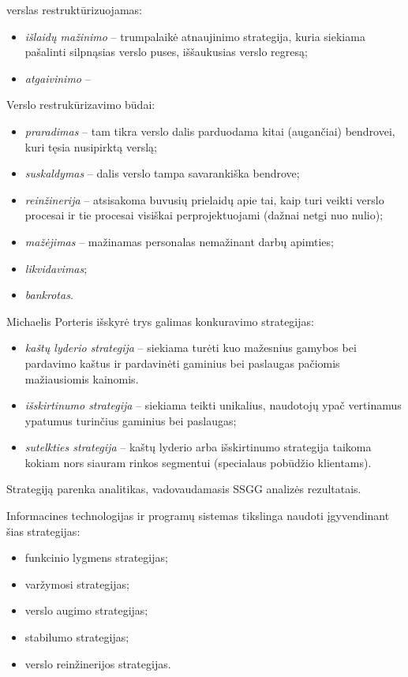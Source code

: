 \begin{itemize}
    verslas restruktūrizuojamas:
    \begin{itemize}
      \item \emph{išlaidų mažinimo}  – trumpalaikė 
        atnaujinimo strategija, kuria siekiama pašalinti silpnąsias verslo
        puses, iššaukusias verslo regresą;
      \item \emph{atgaivinimo}  – 
    \end{itemize}
    Verslo restrukūrizavimo būdai:
    \begin{itemize}
      \item \emph{praradimas}  – tam tikra verslo dalis
        parduodama kitai (augančiai) bendrovei, kuri tęsia nusipirktą
        verslą;
      \item \emph{suskaldymas}  – dalis verslo tampa
        savarankiška bendrove;
      \item \emph{reinžinerija} – atsisakoma buvusių prielaidų apie tai,
        kaip turi veikti verslo procesai ir tie procesai visiškai
        perprojektuojami (dažnai netgi nuo nulio);
      \item \emph{mažėjimas}  – mažinamas 
        personalas nemažinant darbų apimties;
      \item \emph{likvidavimas};
      \item \emph{bankrotas}.
    \end{itemize}
\end{itemize}

Michaelis Porteris  išskyrė trys galimas konkuravimo
strategijas:
\begin{itemize}
  \item \emph{kaštų lyderio strategija} – siekiama turėti kuo mažesnius
    gamybos bei pardavimo kaštus ir pardavinėti gaminius bei paslaugas
    pačiomis mažiausiomis kainomis.
  \item \emph{išskirtinumo strategija} – siekiama teikti unikalius,
    naudotojų ypač vertinamus ypatumus turinčius gaminius bei paslaugas;
  \item \emph{sutelkties strategija} – kaštų lyderio arba išskirtinumo
    strategija taikoma kokiam nors siauram rinkos segmentui (specialaus
    pobūdžio klientams).
\end{itemize}
Strategiją parenka analitikas, vadovaudamasis SSGG analizės rezultatais.

Informacines technologijas ir programų sistemas tikslinga naudoti
įgyvendinant šias strategijas:
\begin{itemize}
  \item funkcinio lygmens strategijas;
  \item varžymosi strategijas;
  \item verslo augimo strategijas;
  \item stabilumo strategijas;
  \item verslo reinžinerijos strategijas.
\end{itemize}

